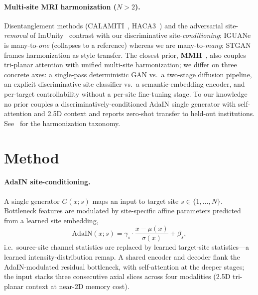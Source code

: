\documentclass[runningheads]{llncs}
\begin{document}
\paragraph{Multi-site MRI harmonization ($N{>}2$).}
Disentanglement methods (CALAMITI~\cite{zuo2021calamiti}, HACA3~\cite{zuo2023haca3})
and the adversarial site-\emph{removal} of ImUnity~\cite{cackowski2023imunity}
contrast with our discriminative site-\emph{conditioning}; IGUANe~\cite{roca2025iguane}
is many-to-\emph{one} (collapses to a reference) whereas we are
many-to-\emph{many}; STGAN~\cite{liu2021stgan} frames harmonization as style
transfer. The closest prior, \textbf{MMH}~\cite{wu2026mmh}, also couples
tri-planar attention with unified multi-site harmonization; we differ on three
concrete axes: a single-pass deterministic GAN vs.\ a two-stage diffusion
pipeline, an explicit discriminative site classifier vs.\ a semantic-embedding
encoder, and per-target controllability without a per-site fine-tuning stage. To
our knowledge no prior couples a discriminatively-conditioned AdaIN single
generator with self-attention and 2.5D context and reports zero-shot transfer to
held-out institutions. See~\cite{yang2025harmsurvey} for the harmonization
taxonomy.

\section{Method}
\label{sec:method}
\paragraph{AdaIN site-conditioning.}
A single generator $G(x; s)$ maps an input to target site $s\in\{1,\dots,N\}$.
Bottleneck features are modulated by site-specific affine parameters predicted
from a learned site embedding,
\begin{equation}
  \mathrm{AdaIN}(x; s) = \gamma_s \cdot \frac{x-\mu(x)}{\sigma(x)} + \beta_s,
  \label{eq:adain}
\end{equation}
i.e.\ source-site channel statistics are replaced by learned target-site
statistics---a learned intensity-distribution remap. A shared encoder and decoder
flank the AdaIN-modulated residual bottleneck, with self-attention at the deeper
stages; the input stacks three consecutive axial slices across four modalities
(2.5D tri-planar context at near-2D memory cost).
\end{document}
